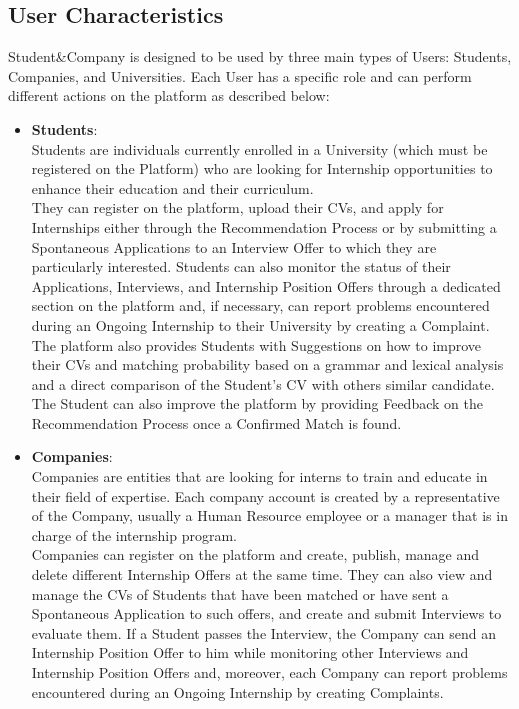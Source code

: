\subsection{User Characteristics}
Student\&Company is designed to be used by three main types of Users: Students, Companies, and Universities. Each User has a specific role and can perform different actions on the platform as described below:
\begin{itemize}
  \item \textbf{Students}: \\
    Students are individuals currently enrolled in a University (which must be registered on the Platform) who are looking for Internship opportunities to enhance their education and their curriculum. \\
    They can register on the platform, upload their CVs, and apply for Internships either through the Recommendation Process or by submitting a Spontaneous Applications to an Interview Offer to which they are particularly interested. Students can also monitor the status of their Applications, Interviews, and Internship Position Offers through a dedicated section on the platform and, if necessary, can report problems encountered during an Ongoing Internship to their University by creating a Complaint.\\
    The platform also provides Students with Suggestions on how to improve their CVs and matching probability based on a grammar and lexical analysis and a direct comparison of the Student's CV with others similar candidate. The Student can also improve the platform by providing Feedback on the Recommendation Process once a Confirmed Match is found.
  \item \textbf{Companies}:\\
    Companies are entities that are looking for interns to train and educate in their field of expertise. Each company account is created by a representative of the Company, usually a Human Resource employee or a manager that is in charge of the internship program. \\
    Companies can register on the platform and create, publish, manage and delete different Internship Offers at the same time. They can also view and manage the CVs of Students that have been matched or have sent a Spontaneous Application to such offers, and create and submit Interviews to evaluate them. If a Student passes the Interview, the Company can send an Internship Position Offer to him while monitoring other Interviews and Internship Position Offers and, moreover, each Company can report problems encountered during an Ongoing Internship by creating Complaints.\\

\end{itemize}
